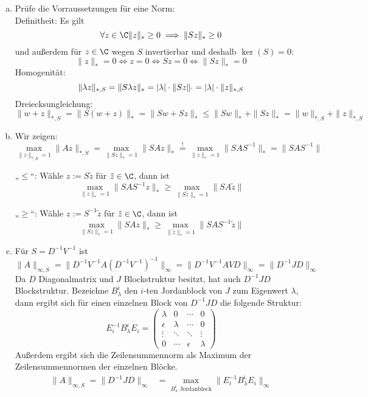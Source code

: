 \documentclass{scrartcl}
\begin{document}
	\begin{aufgabe}
		\begin{enumerate}[a)]
			\item
				Prüfe die Vorraussetzungen für eine Norm:\\
				Definitheit: Es gilt 
				\[
					\forall z\in\C \|z\|_* \ge 0 \implies \|Sz\|_*\ge 0
				\]
				und außerdem für $z\in\C$ wegen $S$ invertierbar und deshalb $\ker(S)=0$:
				\[
					\|z\|_* = 0 \iff z=0 \iff Sz=0 \iff \|Sz\|_* =0
				\]
				Homogenität:
				\[
					\|\lambda z\|_{*,S} = \|S\lambda z\|_* = |\lambda|\cdot \|Sz\|_` = |\lambda|\cdot \|z\|_{*,S}
				\]
				Dreiecksungleichung:
				\[
					\|w+z\|_{*,S} = \|S(w+z)\|_* = \|Sw+Sz\|_* \le \|Sw\|_* + \|Sz\|_* = \|w\|_{*,S} + \|z\|_{*,S}
				\]
			\item
				Wir zeigen:
				\[
					\max_{\|z\|_{*,S}=1}\|Az\|_{*,S} = \max_{\|Sz\|_*=1}\|SAz\|_* \stackrel != \max_{\|z\|_*=1}\|SAS^{-1}\|_* = \|SAS^{-1}\|
				\]
				\begin{seg}{„$\le$“:}
					Wähle $z:=S\tilde z$ für $\tilde z\in \C$, dann ist
					\[
						\max_{\|z\|_*=1}\|SAS^{-1}z\|_* \ge \max_{\|S\tilde z\|_*=1}\|SA\tilde z\|
					\]
				\end{seg}
				\begin{seg}{„$\ge$“:}
					Wähle $z:=S^{-1}\tilde z$ für $\tilde z\in \C$, dann ist
					\[
						\max_{\|Sz\|_*=1}\|SAz\|_* \ge \max_{\|\tilde z\|_*=1}\|SAS^{-1}\tilde z\|
					\]
				\end{seg}
				\newpage
			\item
				Für $S=D^{-1}V^{-1}$ ist
				\[
					\|A\|_{\infty,S} = \|D^{-1}V^{-1}A(D^{-1}V^{-1})^{-1}\|_\infty = \|D^{-1}V^{-1}AVD\|_\infty = \|D^{-1}JD\|_\infty
				\]
				Da $D$ Diagonalmatrix und $J$ Blockstruktur besitzt, hat auch $D^{-1}JD$ Blockstruktur.
				Bezeichne $B_\lambda^i$ den $i$-ten Jordanblock von $J$ zum Eigenwert $\lambda$, dann ergibt sich für einen einzelnen Block von $D^{-1}JD$ die folgende Struktur:
				\[
					E_i^{-1}B_\lambda^iE_i = \begin{pmatrix}\lambda & 0 & \cdots & 0\\\epsilon & \lambda &\cdots&0\\\vdots & \ddots &\ddots&\vdots\\0&\cdots & \epsilon&\lambda\end{pmatrix}
				\]
				Außerdem ergibt sich die Zeilensummennorm als Maximum der Zeilensummennormen der einzelnen Blöcke.
				\begin{align*}
					\|A\|_{\infty,S} = \|D^{-1}JD\|_\infty &= \max_{B_\lambda^i \text{ Jordanblock}} \|E^{-1}_iB_\lambda^iE_i\|_\infty \\

\end{align*}
\end{enumerate}
\end{aufgabe}
\end{document}
